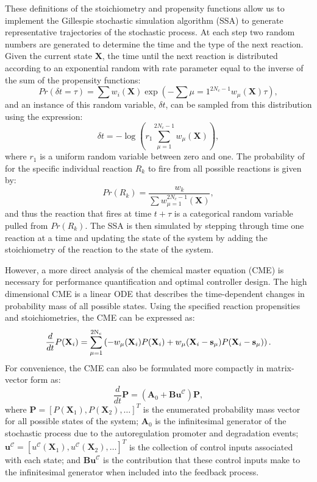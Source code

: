 \documentclass[12pt]{iopart}
\begin{document}
These definitions of the stoichiometry and propensity functions allow us to implement the Gillespie stochastic simulation algorithm (SSA) \cite{Gillespie1992, Gillespie1977} to generate representative trajectories of the stochastic process. At each step two random numbers are generated to determine the time and the type of the next reaction. Given the current state $\mathbf{X}$, the time until the next reaction is distributed according to an exponential random with rate parameter equal to the inverse of the sum of the propensity functions:
\begin{equation}
Pr(\delta t = \tau) = \sum w_i(\mathbf{X}) \exp\left(- \sum{\mu=1}^{2N_c-1} w_\mu(\mathbf{X})\tau\right),
\end{equation}
and an instance of this random variable, $\delta t$,  can be sampled from this distribution using the expression:
\begin{equation}
\delta t = -\log\left(r_1 \sum_{\mu=1}^{2N_c-1}  w_\mu(\mathbf{X})\right),
\end{equation}
where $r_1$ is a uniform random variable between zero and one.
The probability of for the specific individual reaction $R_k$ to fire from all possible reactions is given by:
\begin{equation}
Pr(R_k)=\frac{w_k}{\sum w_{\mu=1}^{2N_c-1} (\mathbf{X})},
\end{equation}
and thus the reaction that fires at time $t+\tau$ is a categorical random variable pulled from $Pr(R_k)$.  The SSA is then simulated by stepping through time one reaction at a time and updating the state of the system by adding the stoichiometry of the reaction to the state of the system.

However, a more direct analysis of the chemical master equation (CME) is necessary for performance quantification and optimal controller design. The high dimensional CME is a linear ODE that describes the time-dependent changes in probability mass of all possible states. Using the specified reaction propensities and stoichiometries, the CME can be expressed as:
\begin{equation}
\frac{d}{dt}P(\mathbf{X}_i)=\sum_{\mu=1}^{2{\rm N_c}}
\left(
-w_{\mu}(\mathbf{X}_i)P(\mathbf{X}_i)
+w_{\mu}(\mathbf{X}_i-\mathbf{s}_{\mu})P(\mathbf{X}_i-\mathbf{s}_{\mu})
\right).\label{CMEindex}
\end{equation}
For convenience, the CME can also be formulated more compactly in matrix-vector form as:
\begin{equation}
\frac{d}{dt}\mathbf{P}=(\mathbf{A}_0+\textbf{Bu}^{\mathcal{C}})\mathbf{P},\label{CME}
\end{equation}
where $\mathbf{P} = [P(\mathbf{X}_1), P(\mathbf{X}_2), \ldots ]^T$ is the enumerated probability mass vector for all possible states of the system; $\mathbf{A}_0$ is the infinitesimal generator of the stochastic process due to the autoregulation promoter and degradation events;  $\textbf{u}^{\mathcal{C}} =[u^{\mathcal{C}}(\mathbf{X}_1), u^{\mathcal{C}}(\mathbf{X}_2), \ldots ]^T$ is the collection of control inputs associated with each state; and $\textbf{Bu}^{\mathcal{C}}$ is the contribution that these control inputs make to the infinitesimal generator when included into the feedback process. 
 
\end{document}
